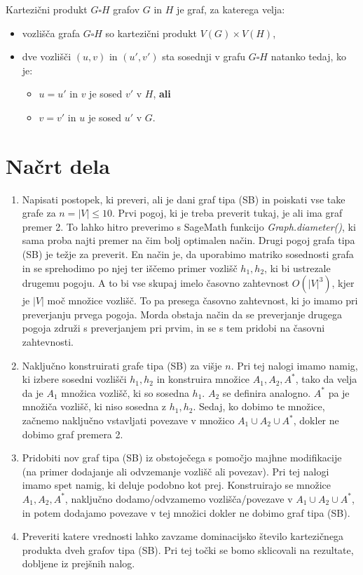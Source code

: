 \documentclass{article}
\begin{document}
\begin{definition}
    Kartezični produkt $G\square H$ grafov $G$ in $H$ je graf, za katerega velja:
    \begin{itemize}
        \item vozlišča grafa $G\square H$ so kartezični produkt $V(G)\times V(H)$,
        \item dve vozlišči $(u,v)$ in $(u',v')$ sta sosednji v grafu $G\square H$ natanko tedaj, ko je:
        \begin{itemize}
            \item $u=u'$ in $v$ je sosed $v'$ v $H$, \textbf{ali}
            \item $v=v'$ in $u$ je sosed $u'$ v $G$.
        \end{itemize}
    \end{itemize}
\end{definition}

\section{Načrt dela}

\begin{enumerate}
    \item Napisati postopek, ki preveri, ali je dani graf tipa (SB) in poiskati vse take grafe za $n = \lvert V \rvert \leq 10$. Prvi pogoj, ki je treba preverit tukaj, je ali ima graf premer 2. To lahko hitro preverimo s SageMath funkcijo \textit{Graph.diameter()}, ki sama proba najti premer na čim bolj optimalen način. Drugi pogoj grafa tipa (SB) je težje za preverit. En način je, da uporabimo matriko sosednosti grafa in se sprehodimo po njej ter iščemo primer vozlišč \(h_1, h_2\), ki bi ustrezale drugemu pogoju. A to bi vse skupaj imelo časovno zahtevnost \(O(|V|^3)\), kjer je \(|V|\) moč množice vozlišč. To pa presega časovno zahtevnost, ki jo imamo pri preverjanju prvega pogoja. Morda obstaja način da se preverjanje drugega pogoja združi s preverjanjem pri prvim, in se s tem pridobi na časovni zahtevnosti.  
    \item Naključno konstruirati grafe tipa (SB) za višje $n$. Pri tej nalogi imamo namig, ki izbere sosedni vozlišči \(h_1, h_2\) in konstruira množice \(A_1, A_2, A^*\), tako da velja da je \(A_1\) množica vozlišč, ki so sosedna \(h_1\). \(A_2\) se definira analogno. \(A^*\) pa je množiča vozlišč, ki niso sosedna z \(h_1, h_2\). Sedaj, ko dobimo te množice, začnemo naključno vstavljati povezave v množico \(A_1 \cup A_2 \cup A^*\), dokler ne dobimo graf premera 2.
    \item Pridobiti nov graf tipa (SB) iz obstoječega s pomočjo majhne modifikacije (na primer dodajanje ali odvzemanje vozlišč ali povezav). Pri tej nalogi imamo spet namig, ki deluje podobno kot prej. Konstruirajo se množice \(A_1, A_2, A^*\), naključno dodamo/odvzamemo vozlišča/povezave v \(A_1 \cup A_2 \cup A^*\), in potem dodajamo povezave v tej množici dokler ne dobimo graf tipa (SB).
    \item Preveriti katere vrednosti lahko zavzame dominacijsko število kartezičnega produkta dveh grafov tipa (SB). Pri tej točki se bomo sklicovali na rezultate, dobljene iz prejšnih nalog.
\end{enumerate}
\end{document}
